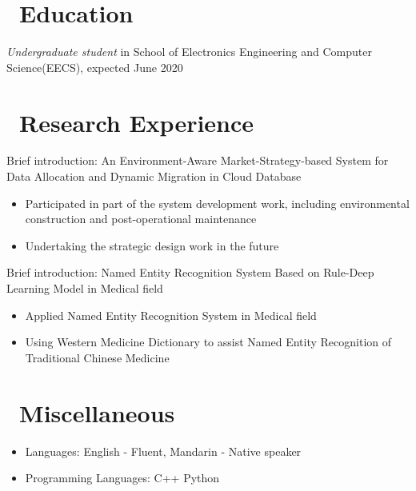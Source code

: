 \documentclass{resume}
\begin{document}



\section{\faGraduationCap\ Education}
\textit{Undergraduate student} in School of Electronics Engineering and Computer Science(EECS), expected June 2020


\section{\faUsers\ Research Experience}
\role{ }{{Supervisor: Tenjiao Wang}}
Brief introduction: An Environment-Aware Market-Strategy-based System for Data Allocation and Dynamic Migration in Cloud Database
\begin{itemize}
  \item Participated in part of the system development work, including environmental construction and post-operational maintenance
  \item Undertaking the strategic design work in the future
\end{itemize}

Brief introduction: Named Entity Recognition System Based on Rule-Deep Learning Model in Medical field
\begin{itemize}
  \item Applied Named Entity Recognition System in Medical field
  \item Using Western Medicine Dictionary to assist Named Entity Recognition of Traditional Chinese Medicine
\end{itemize}




\section{\faInfo\ Miscellaneous}
\begin{itemize}[parsep=0.5ex]
  \item Languages: English - Fluent, Mandarin - Native speaker
  \item Programming Languages: C++ Python
\end{itemize}

%
%
\end{document}
